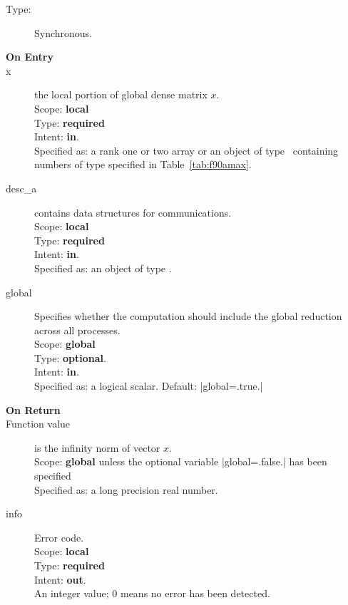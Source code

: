 \begin{description}
\item[Type:] Synchronous.
\item[\bf On Entry]
\item[x] the local portion of global dense matrix
$x$. %
\\
Scope: {\bf local} \\
Type: {\bf required} \\
Intent: {\bf in}.\\
Specified as:  a rank one or two array or an object of type \vdata\
containing numbers of type specified in
Table~\ref{tab:f90amax}.
\item[desc\_a] contains data structures for communications.\\
Scope: {\bf local} \\
Type: {\bf required}\\
Intent: {\bf in}.\\
Specified as: an object of type \descdata.
\item[global]  Specifies whether the computation should include the
  global reduction across all processes.\\
Scope: {\bf global} \\
Type: {\bf optional}.\\
Intent: {\bf in}.\\
Specified as: a logical scalar.
Default: \fortinline|global=.true.|\\%

\item[\bf On Return]
\item[Function value] is the infinity norm of vector $x$.\\
Scope: {\bf global} unless the optional variable
\fortinline|global=.false.| has been specified\\
Specified as: a long precision real number.
\item[info] Error code.\\
Scope: {\bf local} \\
Type: {\bf required} \\
Intent: {\bf out}.\\
An integer value; 0 means no error has been detected.
\end{description}


